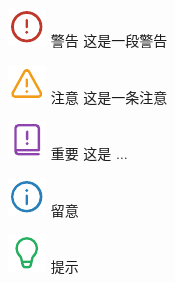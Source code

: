 









\includegraphics[scale=0.5, trim=0 +5pt 0 0]{statics/icon/caution.pdf} {\color{colorCaution}\sffamily\scriptsize 警告} 这是一段警告

\includegraphics[scale=0.5, trim=0 +5pt 0 0]{statics/icon/warning.pdf} {\color{colorWarning}\sffamily\scriptsize 注意} 这是一条注意

\includegraphics[scale=0.5, trim=0 +5pt 0 0]{statics/icon/important.pdf} {\color{colorImportant}\sffamily\scriptsize 重要} 这是 $\ldots$

\includegraphics[scale=0.5, trim=0 +5pt 0 0]{statics/icon/note.pdf} {\color{colorNote}\sffamily\scriptsize 留意}

\includegraphics[scale=0.5, trim=0 +5pt 0 0]{statics/icon/tip.pdf} {\color{colorTip}\sffamily\scriptsize 提示}

